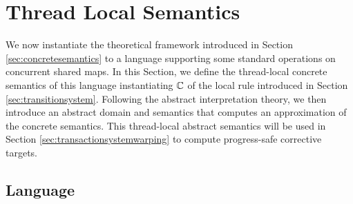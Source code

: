 \newcommand{\set}[1]{\mathsf{#1}}
\newcommand{\isSummary}{\set{isSummary}}
\newcommand{\freshNode}{\set{fresh}}
\newcommand{\heapnode}{\set{HeapNode}}
\newcommand{\reference}{\set{Ref}}
\newcommand{\variable}{\set{Var}}
\newcommand{\env}{\set{Env}}
\newcommand{\map}{\set{Map}}
\newcommand{\aset}[1]{\set{#1}}
\newcommand{\state}{\set{\Sigma}}
\newcommand{\aenv}{\aset{Env}}
\newcommand{\amap}{\aset{Map}}
\newcommand{\astate}{\aset{\Sigma}}
\newcommand{\multistate}{\set{\Phi}}
\newcommand{\amultistate}{\aset{\multistate}}
\newcommand{\serializedCFGs}{\set{serializedCFGs}}
\newcommand{\isconcrete}{\set{single}}
\newcommand{\warpdestination}{\set{corrTarg}}
\newcommand{\concretetransactions}{{\cal T}}
\newcommand{\abstracttransactions}{\concretetransactions^\#}

\section{Thread Local Semantics}
\label{se:instance}
We now instantiate the theoretical framework introduced in Section \ref{sec:concretesemantics} to a language supporting some standard operations on concurrent shared maps. In this Section, we define the thread-local concrete semantics of this language instantiating $\mathbb{C}$ of the {\sf local} rule introduced in Section \ref{sec:transitionsystem}. Following the abstract interpretation theory, we then introduce an abstract domain and semantics that computes an approximation of the concrete semantics. This thread-local abstract semantics will be used in Section \ref{sec:transactionsystemwarping} to compute progress-safe corrective targets.


\subsection{Language}
\label{sect:language}

